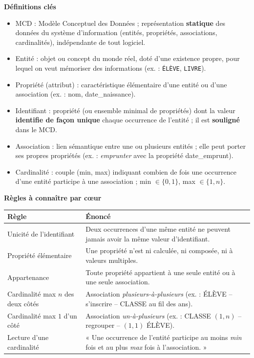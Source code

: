 \documentclass[11pt]{article}
\newcommand{\cle}[1]{{\popxbold\color{popdark}#1}}
\begin{document}
\begin{bilan}
\textbf{Définitions clés}
\begin{itemize}
  \item \cle{MCD} : Modèle Conceptuel des Données ; représentation \textbf{statique} des données du système d'information (entités, propriétés, associations, cardinalités), indépendante de tout logiciel.
  \item \cle{Entité} : objet ou concept du monde réel, doté d'une existence propre, pour lequel on veut mémoriser des informations (ex. : \texttt{ÉLÈVE}, \texttt{LIVRE}).
  \item \cle{Propriété} (attribut) : caractéristique élémentaire d'une entité ou d'une association (ex. : nom, date\_naissance).
  \item \cle{Identifiant} : propriété (ou ensemble minimal de propriétés) dont la valeur \textbf{identifie de façon unique} chaque occurrence de l'entité ; il est \textbf{souligné} dans le MCD.
  \item \cle{Association} : lien sémantique entre une ou plusieurs entités ; elle peut porter ses propres propriétés (ex. : \emph{emprunter} avec la propriété date\_emprunt).
  \item \cle{Cardinalité} : couple (min, max) indiquant combien de fois une occurrence d'une entité participe à une association ; min $\in \{0,1\}$, max $\in \{1,n\}$.
\end{itemize}

\textbf{Règles à connaître par c\oe ur}
\begin{center}
\begin{tabularx}{\linewidth}{|l|X|}
\hline
\rowcolor{popblueL} \textbf{Règle} & \textbf{Énoncé} \\
\hline
Unicité de l'identifiant & Deux occurrences d'une même entité ne peuvent jamais avoir la même valeur d'identifiant. \\
\hline
Propriété élémentaire & Une propriété n'est ni calculée, ni composée, ni à valeurs multiples. \\
\hline
Appartenance & Toute propriété appartient à une seule entité ou à une seule association. \\
\hline
Cardinalité max $n$ des deux côtés & Association \emph{plusieurs-à-plusieurs} (ex. : ÉLÈVE -- s'inscrire -- CLASSE au fil des ans). \\
\hline
Cardinalité max $1$ d'un côté & Association \emph{un-à-plusieurs} (ex. : CLASSE $(1,n)$ -- regrouper -- $(1,1)$ ÉLÈVE). \\
\hline
Lecture d'une cardinalité & « Une occurrence de l'entité participe au moins \emph{min} fois et au plus \emph{max} fois à l'association. » \\
\hline
\end{tabularx}
\end{center}


\end{bilan}
\end{document}
